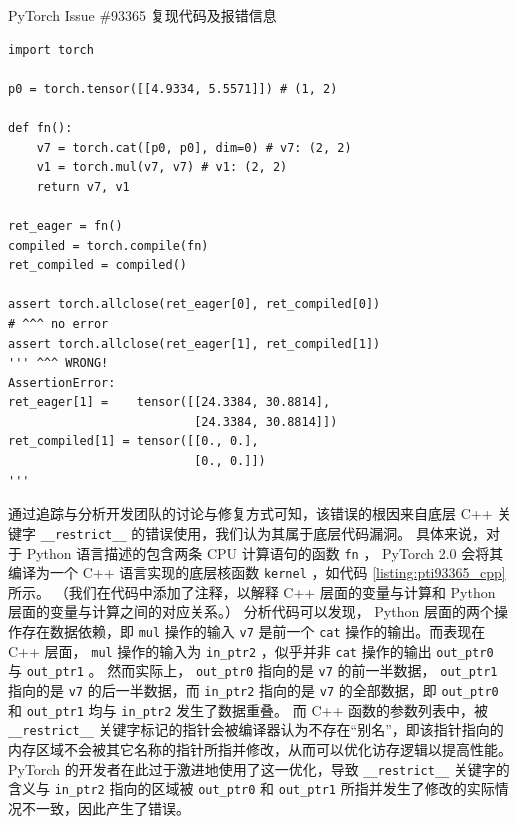 \begin{listing}[]
    \caption{PyTorch Issue \#93365 复现代码及报错信息}
    \label{listing:pti93365}
\begin{verbatim}
import torch

p0 = torch.tensor([[4.9334, 5.5571]]) # (1, 2)

def fn():
    v7 = torch.cat([p0, p0], dim=0) # v7: (2, 2)
    v1 = torch.mul(v7, v7) # v1: (2, 2)
    return v7, v1

ret_eager = fn()
compiled = torch.compile(fn)
ret_compiled = compiled()

assert torch.allclose(ret_eager[0], ret_compiled[0])
# ^^^ no error
assert torch.allclose(ret_eager[1], ret_compiled[1])
''' ^^^ WRONG!
AssertionError: 
ret_eager[1] =    tensor([[24.3384, 30.8814],
                          [24.3384, 30.8814]])
ret_compiled[1] = tensor([[0., 0.],
                          [0., 0.]])
'''
\end{verbatim}
\end{listing}

通过追踪与分析开发团队的讨论与修复方式可知，该错误的根因来自底层 C++ 关键字 \texttt{\_\_restrict\_\_} 的错误使用，我们认为其属于底层代码漏洞。
具体来说，对于 Python 语言描述的包含两条 CPU 计算语句的函数 \texttt{fn} ， PyTorch 2.0 会将其编译为一个 C++ 语言实现的底层核函数 \texttt{kernel} ，如代码 \ref{listing:pti93365_cpp} 所示。
（我们在代码中添加了注释，以解释 C++ 层面的变量与计算和 Python 层面的变量与计算之间的对应关系。）
分析代码可以发现， Python 层面的两个操作存在数据依赖，即 \texttt{mul} 操作的输入 \texttt{v7} 是前一个 \texttt{cat} 操作的输出。而表现在 C++ 层面， \texttt{mul} 操作的输入为 \texttt{in\_ptr2} ，似乎并非 \texttt{cat} 操作的输出 \texttt{out\_ptr0} 与 \texttt{out\_ptr1} 。
然而实际上， \texttt{out\_ptr0} 指向的是 \texttt{v7} 的前一半数据， \texttt{out\_ptr1} 指向的是 \texttt{v7} 的后一半数据，而 \texttt{in\_ptr2} 指向的是 \texttt{v7} 的全部数据，即 \texttt{out\_ptr0} 和 \texttt{out\_ptr1} 均与 \texttt{in\_ptr2} 发生了数据重叠。
而 C++ 函数的参数列表中，被 \texttt{\_\_restrict\_\_} 关键字标记的指针会被编译器认为不存在“别名”，即该指针指向的内存区域不会被其它名称的指针所指并修改，从而可以优化访存逻辑以提高性能。
PyTorch 的开发者在此过于激进地使用了这一优化，导致 \texttt{\_\_restrict\_\_} 关键字的含义与 \texttt{in\_ptr2} 指向的区域被 \texttt{out\_ptr0} 和 \texttt{out\_ptr1} 所指并发生了修改的实际情况不一致，因此产生了错误。


